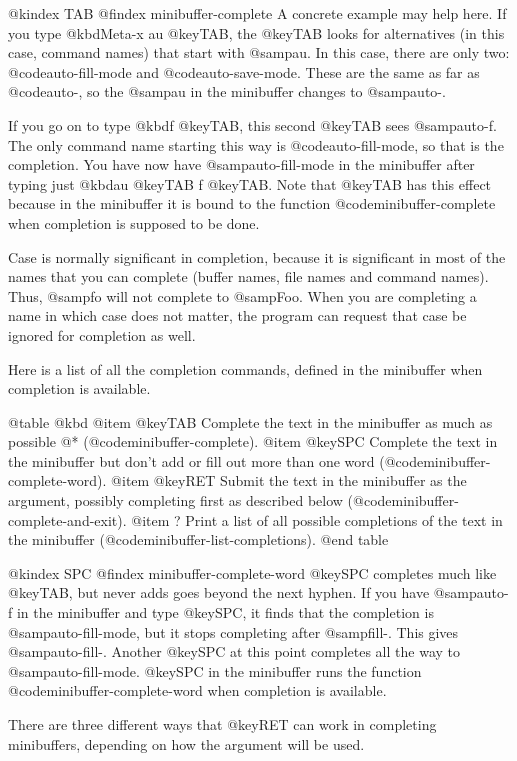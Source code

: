 {{{{{@kindex TAB
@findex minibuffer-complete
  A concrete example may help here.  If you type @kbd{Meta-x au @key{TAB}}, the @key{TAB}
looks for alternatives (in this case, command names) that start with
@samp{au}.  In this case, there are only two: @code{auto-fill-mode} and
@code{auto-save-mode}.  These are the same as far as @code{auto-}, so the
@samp{au} in the minibuffer changes to @samp{auto-}.

  If you go on to type @kbd{f @key{TAB}}, this second @key{TAB} sees @samp{auto-f}.
The only command name starting this way is @code{auto-fill-mode}, so that
is the completion.  You have now have @samp{auto-fill-mode} in the
minibuffer after typing just @kbd{au @key{TAB} f @key{TAB}}.  Note that
@key{TAB} has this effect because in the minibuffer it is bound to the
function @code{minibuffer-complete} when completion is supposed to be done.

  Case is normally significant in completion, because it is significant in
most of the names that you can complete (buffer names, file names and
command names).  Thus, @samp{fo} will not complete to @samp{Foo}.  When you
are completing a name in which case does not matter, the program can request
that case be ignored for completion as well.

  Here is a list of all the completion commands, defined in the minibuffer
when completion is available.

@table @kbd
@item @key{TAB}
Complete the text in the minibuffer as much as possible @*
(@code{minibuffer-complete}).
@item @key{SPC}
Complete the text in the minibuffer but don't add or fill out more
than one word (@code{minibuffer-complete-word}).
@item @key{RET}
Submit the text in the minibuffer as the argument, possibly completing
first as described below (@code{minibuffer-complete-and-exit}).
@item ?
Print a list of all possible completions of the text in the minibuffer
(@code{minibuffer-list-completions}).
@end table

@kindex SPC
@findex minibuffer-complete-word
  @key{SPC} completes much like @key{TAB}, but never adds goes beyond the
next hyphen.  If you have @samp{auto-f} in the minibuffer and type
@key{SPC}, it finds that the completion is @samp{auto-fill-mode}, but it
stops completing after @samp{fill-}.  This gives @samp{auto-fill-}.
Another @key{SPC} at this point completes all the way to
@samp{auto-fill-mode}.  @key{SPC} in the minibuffer runs the function
@code{minibuffer-complete-word} when completion is available.

  There are three different ways that @key{RET} can work in completing
minibuffers, depending on how the argument will be used.

}}}}}
